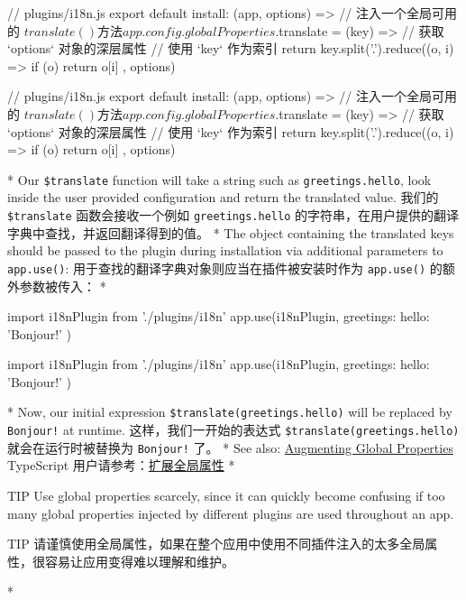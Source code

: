 \begin{paracol}{2}
\begin{codeJs}
// plugins/i18n.js
export default {
  install: (app, options) => {
    // 注入一个全局可用的 $translate() 方法
    app.config.globalProperties.$translate = (key) => {
      // 获取 `options` 对象的深层属性
      // 使用 `key` 作为索引
      return key.split('.').reduce((o, i) => {
        if (o) return o[i]
      }, options)
    }
  }
}
\end{codeJs}
\switchcolumn
\begin{codeJs}
// plugins/i18n.js
export default {
  install: (app, options) => {
    // 注入一个全局可用的 $translate() 方法
    app.config.globalProperties.$translate = (key) => {
      // 获取 `options` 对象的深层属性
      // 使用 `key` 作为索引
      return key.split('.').reduce((o, i) => {
        if (o) return o[i]
      }, options)
    }
  }
}
\end{codeJs}
\switchcolumn[0]*%
Our \texttt{\$translate} function will take a string such as
\texttt{greetings.hello}, look inside the user provided configuration
and return the translated value.
\switchcolumn
我们的 \texttt{\$translate} 函数会接收一个例如 \texttt{greetings.hello}
的字符串，在用户提供的翻译字典中查找，并返回翻译得到的值。
\switchcolumn[0]*%
The object containing the translated keys should be passed to the plugin
during installation via additional parameters to \texttt{app.use()}:
\switchcolumn
用于查找的翻译字典对象则应当在插件被安装时作为 \texttt{app.use()}
的额外参数被传入：
\switchcolumn[0]*%
\begin{codeJs}
import i18nPlugin from './plugins/i18n'
app.use(i18nPlugin, {
  greetings: {
    hello: 'Bonjour!'
  }
})
\end{codeJs}
\switchcolumn
\begin{codeJs}
import i18nPlugin from './plugins/i18n'
app.use(i18nPlugin, {
  greetings: {
    hello: 'Bonjour!'
  }
})
\end{codeJs}
\switchcolumn[0]*%
Now, our initial expression
\texttt{\$translate(\textquotesingle{}greetings.hello\textquotesingle{})}
will be replaced by \texttt{Bonjour!} at runtime.
\switchcolumn
这样，我们一开始的表达式
\texttt{\$translate(\textquotesingle{}greetings.hello\textquotesingle{})}
就会在运行时被替换为 \texttt{Bonjour!} 了。 
\switchcolumn[0]*%
See also:
\href{https://vuejs.org/guide/typescript/options-api.html\#augmenting-global-properties}{Augmenting
Global Properties}
\switchcolumn
TypeScript
用户请参考：\href{https://cn.vuejs.org/guide/typescript/options-api.html\#augmenting-global-properties}{扩展全局属性}
\switchcolumn[0]*%
\begin{vueQuote}{TIP}
Use global properties scarcely, since it can quickly become confusing if
too many global properties injected by different plugins are used
throughout an app.
\end{vueQuote} 
\switchcolumn
\begin{vueQuote}{TIP}
请谨慎使用全局属性，如果在整个应用中使用不同插件注入的太多全局属性，很容易让应用变得难以理解和维护。
\end{vueQuote} 
\switchcolumn[0]*%

\end{paracol}

